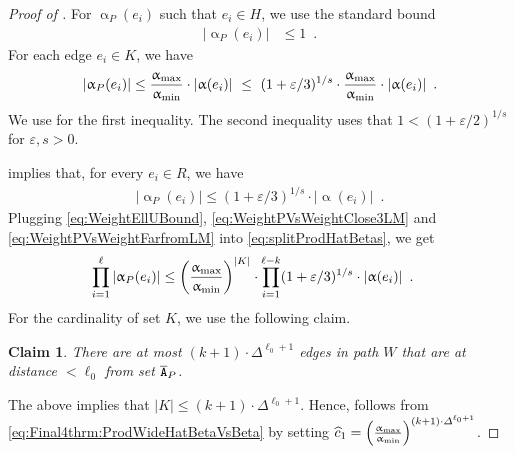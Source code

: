 \documentclass[11pt,reqno]{amsart}
\numberwithin{equation}{section}
\newtheorem{claim}[theorem]{Claim}
\newcommand{\applegreen}[1]{ {\color{applegreen}#1}}
\newcommand{\blue}[1]{{\color{blue}#1}}
\newcommand{\bluepigment}[1]{{\color{blue(pigment)}#1}}
\newcommand{\capri}[1]{{\color{capri}#1}}
\newcommand{\darkmagenta}[1]{{\color{darkmagenta}#1}}
\newcommand{\goldenbrown}[1]{{\color{goldenbrown}#1}}
\newcommand{\maxDeg}{{\Delta}}
\newcommand{\pfs}{\darkmagenta{s}}
\newcommand{\abs}[1]{\blue{|}#1\blue{|}}
\renewcommand{\applegreen}[1]{#1}
\renewcommand{\blue}[1]{#1}
\renewcommand{\bluepigment}[1]{#1}
\renewcommand{\capri}[1]{#1}
\renewcommand{\darkmagenta}[1]{#1}
\renewcommand{\goldenbrown}[1]{#1}
\newcommand{\ke}{\blue{e}}
\newcommand{\ki}{\capri{i}}
\newcommand{\kK}{\bluepigment{K}}
\newcommand{\kk}{\bluepigment{k}}
\newcommand{\kell}{{\color{green(pigment)}\ell}}%
\newcommand{\kP}{\goldenbrown{P}}
\newcommand{\kW}{\blue{W}}
\renewcommand{\ke}{e}
\renewcommand{\ki}{i}
\renewcommand{\kK}{K}
\renewcommand{\kk}{k}
\renewcommand{\kell}{\ell}
\renewcommand{\kP}{P}
\renewcommand{\kW}{W}
\newcommand{\infweight}{\upalpha}
\begin{document}
\begin{proof}[Proof of ]
For $\infweight_{\kP}(\ke_i)$ such that  $\ke_{\ki}\in H$,   we use the standard bound 
%
%
\begin{align}\label{eq:WeightEllUBound}
\abs{\infweight_{\kP}(\ke_{\ki})} &\leq 1\enspace. 
\end{align}
For each edge $\ke_{\ki}\in \kK$, %
we have 
\begin{align}\label{eq:WeightPVsWeightClose3LM}
\abs{ \infweight_{\kP}(\ke_{\ki}) } \leq \frac{\infweight_{\rm max}}{\infweight_{\rm min}} \cdot \abs{\infweight(\ke_{\ki})}
\ \leq \ (1+\varepsilon/3)^{{1}/{\pfs}} \cdot \frac{\infweight_{\rm max}}{\infweight_{\rm min}} \cdot \abs{\infweight(\ke_{\ki})} \enspace.
\end{align}
We use   for the first inequality. The second inequality 
uses that $1<(1+\varepsilon/2)^{{1}/{\pfs}}$ for $\varepsilon, \pfs>0$. 




  implies that, for every $\ke_{\ki} \in R$, we have
\begin{align}\label{eq:WeightPVsWeightFarfromLM}
\abs{ \infweight_{\kP}(\ke_{\ki}) }  \leq (1+\varepsilon/3)^{{1}/{\pfs}}\cdot \abs{ \infweight(\ke_{\ki})} \enspace.
\end{align}
Plugging \eqref{eq:WeightEllUBound}, \eqref{eq:WeightPVsWeightClose3LM} and \eqref{eq:WeightPVsWeightFarfromLM}
into \eqref{eq:splitProdHatBetas}, we get
%
\begin{align}\label{eq:Final4thrm:ProdWideHatBetaVsBeta}
\prod^{\kell}_{\ki=1} \abs{\infweight_{\kP}(\ke_{\ki})}
%
&\leq \left( \frac{\infweight_{\rm max}}{\infweight_{\rm min}} \right)^{\abs{\kK}}
\cdot 
\prod^{\kell-\kk}_{\ki=1} (1+\varepsilon/3)^{{1}/{s}} \cdot \abs{\infweight(\ke_{\ki})}\enspace.
\end{align}
For  the cardinality of set $\kK$, we use the following claim. 
\begin{claim}\label{cliam:NoOfEdgeClose2LM}
There are at most $(\kk+1)\cdot \maxDeg^{\ell_0+1}$ edges in path $\kW$ that are at distance $<\ell_0$ from set $\cpTP$. 
\end{claim}
The above implies that $\abs{\kK}\leq (\kk+1) \cdot \maxDeg^{\ell_0+1}$. 
Hence,  follows from \eqref{eq:Final4thrm:ProdWideHatBetaVsBeta} by setting 
$\widehat{c}_1=\left( \frac{\infweight_{\rm max}}{\infweight_{\rm min}} \right)^{(\kk+1)\cdot \maxDeg^{\ell_0+1}}$.
\end{proof}
\end{document}
